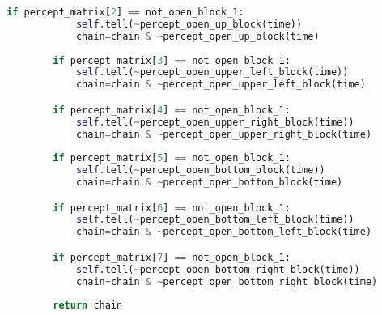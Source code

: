 \begin{lstlisting}[language=Python, caption=Agent Sensor Implmentation.]
        if percept_matrix[2] == not_open_block_1:
            self.tell(~percept_open_up_block(time))
            chain=chain & ~percept_open_up_block(time)
            
        if percept_matrix[3] == not_open_block_1:
            self.tell(~percept_open_upper_left_block(time))
            chain=chain & ~percept_open_upper_left_block(time)

        if percept_matrix[4] == not_open_block_1:
            self.tell(~percept_open_upper_right_block(time))
            chain=chain & ~percept_open_upper_right_block(time)
            
        if percept_matrix[5] == not_open_block_1:
            self.tell(~percept_open_bottom_block(time))
            chain=chain & ~percept_open_bottom_block(time)

        if percept_matrix[6] == not_open_block_1:
            self.tell(~percept_open_bottom_left_block(time))
            chain=chain & ~percept_open_bottom_left_block(time)

        if percept_matrix[7] == not_open_block_1:
            self.tell(~percept_open_bottom_right_block(time))
            chain=chain & ~percept_open_bottom_right_block(time)
            
        return chain 
\end{lstlisting}
\label{listing:sensor}


